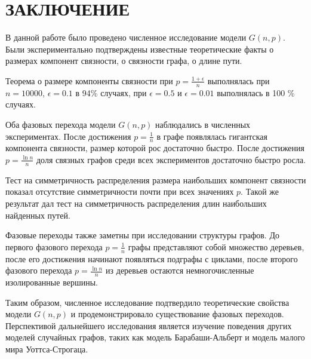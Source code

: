 \section*{ЗАКЛЮЧЕНИЕ}
В данной работе было проведено численное исследование модели $G(n,p)$. Были экспериментально подтверждены известные теоретические факты 
о размерах компонент связности, о связности графа, о длине пути.

Теорема о размере компоненты связности при $p = \frac{1+\epsilon}{n}$ выполнялась при $n=10000$, $\epsilon=0.1$ в 
94\% случаях, при $\epsilon = 0.5$ и $\epsilon=0.01$  
выполнялась в 100 \% случаях.

Оба фазовых перехода модели $G(n,p)$ наблюдались в численных экспериментах. После достижения  $p = \frac{1}{n}$ 
в графе появлялась гигантская компонента связности, размер
которой рос достаточно быстро. После достижения 
$p = \frac{\ln{n}}{n}$ доля связных графов среди всех экспериментов достаточно быстро росла.

Тест на симметричность распределения размера наибольших
компонент связности показал отсутствие симметричности 
почти при всех значениях $p$. Такой же результат дал
тест на симметричность распределения длин наибольших найденных путей.

Фазовые переходы также заметны при исследовании структуры графов. 
До первого фазового перехода $p=\frac{1}{n}$ 
графы представляют собой множество деревьев, после 
его достижения начинают появляться подграфы с циклами, 
после второго фазового перехода $p = \frac{\ln{n}}{n}$
из деревьев остаются немногочисленные изолированные вершины.

Таким образом, численное исследование подтвердило теоретические 
свойства модели $G(n,p)$ и продемонстрировало 
существование фазовых переходов. Перспективой дальнейшего исследования является изучение
поведения других моделей случайных графов, таких 
как модель Барабаши-Альберт и модель малого мира Уоттса-Строгаца.
